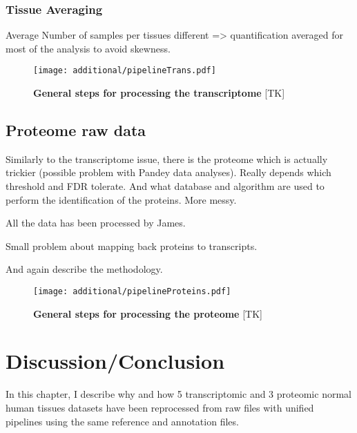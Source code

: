 \subsubsection{Tissue Averaging}
Average Number of samples per tissues different => quantification averaged for
most of the analysis to avoid skewness.





\begin{figure}
    \texttt{[image: additional/pipelineTrans.pdf]}\centering
    \caption[General steps for processing the transcriptomic
    data]{\label{fig:pipelineTrans}\textbf{General steps for processing the
    transcriptome} [TK]}
  \end{figure}


\subsection{Proteome raw data}

Similarly to the transcriptome issue, there is the proteome which is actually
trickier (possible problem with Pandey data analyses). Really depends which
threshold and \gls{FDR} tolerate. And what database and algorithm are used to perform
the identification of the proteins. More messy.

All the data has been processed by James.

Small problem about mapping back proteins to transcripts.



And again describe the methodology.

  \begin{figure}
      \texttt{[image: additional/pipelineProteins.pdf]}\centering
      \caption[General steps for processing the proteome
      data]{\label{fig:pipelineProt}\textbf{General steps for processing the
      proteome} [TK] }
  \end{figure}

\section{Discussion/Conclusion}

In this chapter, I describe why and how 5 transcriptomic and 3 proteomic normal
human tissues datasets have been reprocessed from raw files with unified
pipelines using the same reference and annotation files.




